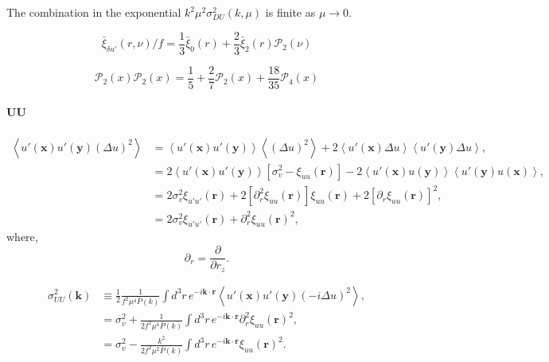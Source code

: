 \documentclass[a4paper,11pt, fleqn]{article}
\begin{document}
The combination in the exponential $k^2\mu^2 \sigma_{DU}^2(k, \mu)$ is
finite as $\mu \rightarrow 0$.

\begin{equation}
  \bar{\xi}_{\delta u'}(r, \nu)/f
  = \frac{1}{3} \bar{\xi}_0(r) + \frac{2}{3} \bar{\xi}_2(r) \mathcal{P}_2(\nu)
\end{equation}

\begin{equation}
  \mathcal{P}_2(x) \mathcal{P}_2(x)
  = \frac{1}{5} + \frac{2}{7} \mathcal{P}_2(x)
    + \frac{18}{35} \mathcal{P}_4(x)
\end{equation}

%
%
\clearpage
\paragraph{UU}

\begin{equation} \begin{split}
  \left\langle u'(\bm{x}) u'(\bm{y}) ( \Delta u )^2 \right\rangle
  &=  \left\langle u'(\bm{x}) u'(\bm{y}) \right\rangle
      \left\langle (\Delta u )^2 \right\rangle
      + 2 \left\langle u'(\bm{x}) \Delta u \right\rangle
          \left\langle u'(\bm{y}) \Delta u \right\rangle,\\
  &= 2 \left\langle u'(\bm{x}) u'(\bm{y}) \right\rangle
       \left[ \sigma_v^2 - \xi_{uu}(\bm{r}) \right]
    - 2 \left\langle u'(\bm{x}) u(\bm{y}) \right\rangle
        \left\langle u'(\bm{y}) u(\bm{x}) \right\rangle,\\
  &= 2 \sigma_v^2 \xi_{u'u'}(\bm{r})
     + 2 [\partial_r^2 \xi_{uu}(\bm{r})] \xi_{uu}(\bm{r}) 
     + 2 [\partial_r \xi_{uu}(\bm{r})]^2,\\
  &= 2 \sigma_v^2 \xi_{u'u'}(\bm{r})
     + \partial_r^2 \xi_{uu}(\bm{r})^2,
\end{split}\end{equation}
where,
\begin{equation}
  \partial_r = \frac{\partial}{\partial r_z}.
\end{equation}

\begin{equation} \begin{split}
  \sigma_{UU}^2(\bm{k})
  &\equiv \frac{1}{2}\frac{1}{f^2\mu^4 \bar{P}(k)}
     \int\!\! d^3r \, e^{-i\bm{k}\cdot\bm{r}}
     \left\langle u'(\bm{x}) u'(\bm{y}) ( -i \Delta u )^2 \right\rangle,\\
  &= \sigma_v^2
     + \frac{1}{2 f^2\mu^4 \bar{P}(k)}
       \int\!\! d^3r \, e^{-i\bm{k}\cdot\bm{r}}
       \partial_r^2 \xi_{uu}(\bm{r})^2,\\
  &= \sigma_v^2 - \frac{k^2}{2 f^2 \mu^2 \bar{P}(k)}
     \int\!\! d^3r \, e^{-i\bm{k}\cdot\bm{r}} \xi_{uu}(\bm{r})^2.
\end{split}\end{equation}
\end{document}
